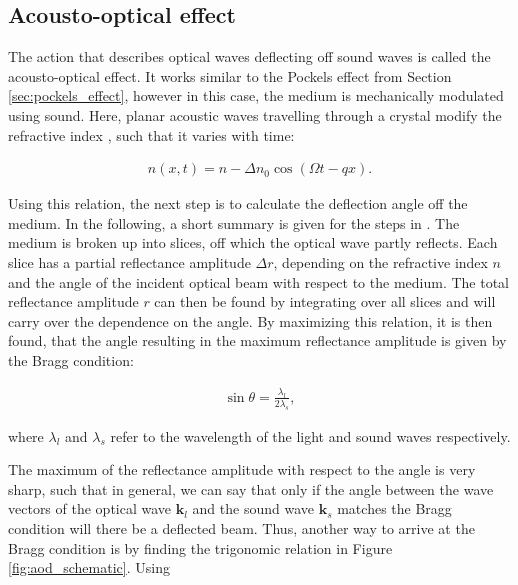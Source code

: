 \subsection{Acousto-optical effect}

The action that describes optical waves deflecting off sound waves is called the acousto-optical effect. It works similar to the Pockels effect from Section \ref{sec:pockels_effect}, however in this case, the medium is mechanically modulated using sound. Here, planar acoustic waves travelling through a crystal modify the refractive index \cite{Saleh1991}, such that it varies with time:

\begin{align}
	n(x, t) = n - \Delta n_0 \cos{\left(\Omega t - q x\right)} .
\end{align}

Using this relation, the next step is to calculate the deflection angle off the medium. In the following, a short summary is given for the steps in \cite{Saleh1991}. The medium is broken up into slices, off which the optical wave partly reflects. Each slice has a partial reflectance amplitude $\Delta r$, depending on the refractive index $n$ and the angle of the incident optical beam with respect to the medium. The total reflectance amplitude $r$ can then be found by integrating over all slices and will carry over the dependence on the angle. By maximizing this relation, it is then found, that the angle resulting in the maximum reflectance amplitude is given by the Bragg condition:


\begin{align}
	\sin \theta = \frac{\lambda_l}{2 \lambda_s},
\end{align}

where $\lambda_l$ and $\lambda_s$ refer to the wavelength of the light and sound waves respectively.

The maximum of the reflectance amplitude with respect to the angle is very sharp, such that in general, we can say that only if the angle between the wave vectors of the optical wave $\mathbf{k}_l$ and the sound wave $\mathbf{k}_s$ matches the Bragg condition will there be a deflected beam. Thus, another way to arrive at the Bragg condition is by finding the trigonomic relation in Figure \ref{fig:aod_schematic}. Using

